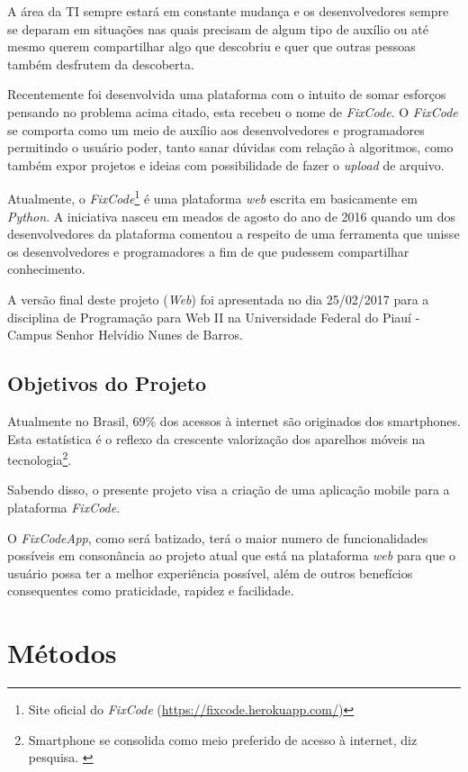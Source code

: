 \documentclass[
	article,			%
	11pt,				%
	oneside,			%
	a4paper,			%
	english,			%
	brazil,				%
	sumario=tradicional
	]{abntex2}
\begin{document}
A área da TI sempre estará em constante mudança e os desenvolvedores sempre se deparam em situações nas quais precisam de algum tipo de auxílio ou até mesmo querem compartilhar algo que descobriu e quer que outras pessoas também desfrutem da descoberta.

Recentemente foi desenvolvida uma plataforma com o intuito de somar esforços pensando no problema acima citado, esta recebeu o nome de \textit{FixCode}. O \textit{FixCode} se comporta como um meio de auxílio aos desenvolvedores e programadores permitindo o usuário poder, tanto sanar dúvidas com relação à algoritmos, como também expor projetos e ideias com possibilidade de fazer o \textit{upload} de arquivo.

Atualmente, o \textit{FixCode}\footnote{Site oficial do  \textit{FixCode} (\href{https://fixcode.herokuapp.com/}{https://fixcode.herokuapp.com/})} é uma plataforma \textit{web} escrita em basicamente em \textit{Python}. A iniciativa nasceu em meados de agosto do ano de 2016 quando um dos desenvolvedores da plataforma comentou a respeito de uma ferramenta que unisse os desenvolvedores e programadores a fim de que pudessem compartilhar conhecimento.
 
A versão final deste projeto (\textit{Web}) foi apresentada no dia 25/02/2017 para a disciplina de Programação para Web II na Universidade Federal do Piauí - Campus Senhor Helvídio Nunes de Barros.

\subsection{Objetivos do Projeto}

Atualmente no Brasil, 69\% dos acessos à internet são originados dos smartphones. Esta estatística é o reflexo da crescente valorização dos aparelhos móveis na tecnologia\footnote{Smartphone se consolida como meio preferido de acesso à internet, diz pesquisa. \cite{smart}}. 

Sabendo disso, o presente projeto visa a criação de uma aplicação mobile para a plataforma \textit{FixCode}.

O \textit{FixCodeApp}, como será batizado, terá o maior numero de funcionalidades possíveis em consonância ao projeto atual que está na plataforma \textit{web} para que o usuário possa ter a melhor experiência possível, além de outros benefícios consequentes como praticidade, rapidez e facilidade.

\section{Métodos}
\end{document}
